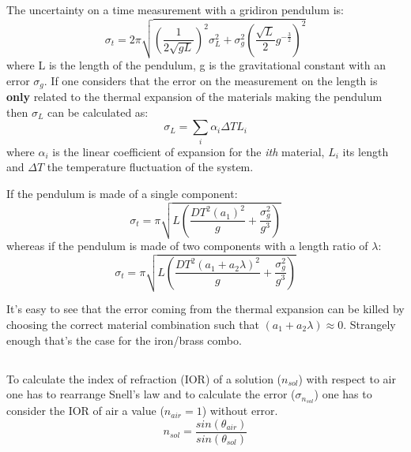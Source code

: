 \documentclass[twocolumn]{article}
\begin{document}
\subsection{} %
\label{sub:gridiron}
	The uncertainty on a time measurement with a gridiron pendulum is:
	\begin{equation}
		\sigma_t  = 2 \pi \sqrt{ (\frac{1}{2 \sqrt{g L }} ) ^{2} \sigma_L ^2 +
		\sigma_g ^2 (\frac{\sqrt{L}}{2} g^{-\frac{3}{2}})^2
		}
	\end{equation}
	where L is the length of the pendulum, g is the gravitational constant with an error $\sigma_g$.
	If one considers that the error on the measurement on the length is \textbf{only} related to the thermal expansion of the materials making the pendulum then $\sigma_L$ can be calculated as:
	\begin{equation}
		\sigma_L = \sum_i \alpha_i  \Delta T  L_i
	\end{equation}
	where $\alpha_i$ is the linear coefficient of expansion for the \emph{ith} material, $L_i$ its length and $\Delta T $ the temperature fluctuation of the system.

	If the pendulum is made of a single component:
	\begin{equation}
	\sigma_t  = \pi \sqrt{L \left(\frac{DT^{2} \left(a_{1} \right)^{2}}{g} + \frac{\sigma_{g}^{2}}{g^{3}}\right)}
	\end{equation}
	whereas if the pendulum is made of two components with a length ratio of $\lambda$:
	\begin{equation}
	\sigma_t  = \pi \sqrt{L \left(\frac{DT^{2} \left(a_{1} + a_{2} \lambda \right)^{2}}{g} + \frac{\sigma_{g}^{2}}{g^{3}}\right)}
	\end{equation}

	It's easy to see that the error coming from the thermal expansion can be killed by choosing the correct material combination such that $ \left(a_{1} + a_{2} \lambda\right) \approx 0 $. Strangely enough that's the case for the iron/brass combo.
\subsection{} %
\label{sub:snell}
	To calculate the index of refraction (IOR) of a solution ($n_{sol}$) with respect to air one has to rearrange Snell's law and to calculate the error ($\sigma_{n_{sol}}$) one has to consider the IOR of air a value ($n_{air} =1 $) without error.
	\begin{equation}
	n_{sol} = \frac{ sin(\theta_{air})}{sin(\theta_{sol})} 
	\end{equation}
\end{document}
